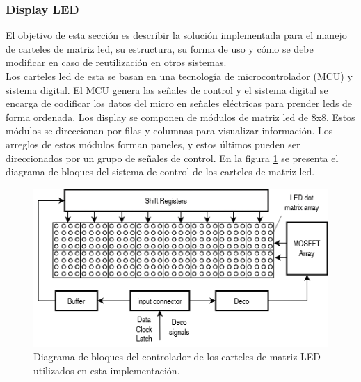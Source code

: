 \pagebreak
\subsubsection{Display LED}

El objetivo de esta sección es describir la solución implementada para el manejo de carteles de matriz led, su estructura, su forma de uso y cómo se debe modificar en caso de reutilización en otros sistemas.\\

Los carteles led de esta se basan en una tecnología de microcontrolador (MCU) y sistema digital. El MCU genera las señales de control y el sistema digital se encarga de codificar los datos del micro en señales eléctricas para prender leds de forma ordenada. Los display se componen de módulos de matriz led de 8x8. Estos módulos se direccionan por filas y columnas para  visualizar información. Los arreglos de estos módulos forman paneles, y estos últimos pueden ser direccionados por un grupo de señales de control. En la figura \ref{fig:diagDriverLED} se presenta el diagrama de bloques del sistema de control de los carteles de matriz led.\\


\begin{figure}[ht]
	\centering
	\includegraphics[width=1\textwidth]{./Figures/diagDriverLED.png}
	\caption{Diagrama de bloques del controlador de los carteles de matriz LED utilizados en esta implementación.}
	\label{fig:diagDriverLED}
\end{figure}

